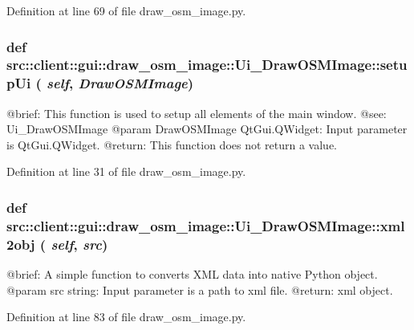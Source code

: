 Definition at line 69 of file draw\_\-osm\_\-image.py.

\hypertarget{classsrc_1_1client_1_1gui_1_1draw__osm__image_1_1Ui__DrawOSMImage_ab73c4403cb6b42e3a9c16de501f18e7d}{
\subsubsection[{setupUi}]{\setlength{\rightskip}{0pt plus 5cm}def src::client::gui::draw\_\-osm\_\-image::Ui\_\-DrawOSMImage::setupUi ( {\em self}, \/   {\em DrawOSMImage})}}
\label{classsrc_1_1client_1_1gui_1_1draw__osm__image_1_1Ui__DrawOSMImage_ab73c4403cb6b42e3a9c16de501f18e7d}
\begin{DoxyVerb}
@brief: This function is used to setup all elements of the main window.
@see: Ui_DrawOSMImage
@param DrawOSMImage QtGui.QWidget: Input parameter is QtGui.QWidget.
@return: This function does not return a value. 
\end{DoxyVerb}
 

Definition at line 31 of file draw\_\-osm\_\-image.py.

\hypertarget{classsrc_1_1client_1_1gui_1_1draw__osm__image_1_1Ui__DrawOSMImage_a64487b1d4648b4267c32a6a019213c03}{
\subsubsection[{xml2obj}]{\setlength{\rightskip}{0pt plus 5cm}def src::client::gui::draw\_\-osm\_\-image::Ui\_\-DrawOSMImage::xml2obj ( {\em self}, \/   {\em src})}}
\label{classsrc_1_1client_1_1gui_1_1draw__osm__image_1_1Ui__DrawOSMImage_a64487b1d4648b4267c32a6a019213c03}
\begin{DoxyVerb}
@brief: A simple function to converts XML data into native Python object.
@param src string: Input parameter is a path to xml file.
@return: xml object. 
\end{DoxyVerb}
 

Definition at line 83 of file draw\_\-osm\_\-image.py.



